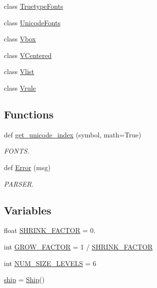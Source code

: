 \begin{DoxyCompactItemize}
\item 
class \hyperlink{classmatplotlib_1_1__mathtext_1_1TruetypeFonts}{Truetype\+Fonts}
\item 
class \hyperlink{classmatplotlib_1_1__mathtext_1_1UnicodeFonts}{Unicode\+Fonts}
\item 
class \hyperlink{classmatplotlib_1_1__mathtext_1_1Vbox}{Vbox}
\item 
class \hyperlink{classmatplotlib_1_1__mathtext_1_1VCentered}{V\+Centered}
\item 
class \hyperlink{classmatplotlib_1_1__mathtext_1_1Vlist}{Vlist}
\item 
class \hyperlink{classmatplotlib_1_1__mathtext_1_1Vrule}{Vrule}
\end{DoxyCompactItemize}
\subsection*{Functions}
\begin{DoxyCompactItemize}
\item 
def \hyperlink{namespacematplotlib_1_1__mathtext_abb90b6223775b3aa81cddd113bd774b5}{get\+\_\+unicode\+\_\+index} (symbol, math=True)
\begin{DoxyCompactList}\small\item\em F\+O\+N\+TS. \end{DoxyCompactList}\item 
def \hyperlink{namespacematplotlib_1_1__mathtext_a1a53497c9c5204fef2d4475ab2493f9f}{Error} (msg)
\begin{DoxyCompactList}\small\item\em P\+A\+R\+S\+ER. \end{DoxyCompactList}\end{DoxyCompactItemize}
\subsection*{Variables}
\begin{DoxyCompactItemize}
\item 
float \hyperlink{namespacematplotlib_1_1__mathtext_a6ea1ec341ab87d7a021698fc808350ad}{S\+H\+R\+I\+N\+K\+\_\+\+F\+A\+C\+T\+OR} = 0.
\item 
int \hyperlink{namespacematplotlib_1_1__mathtext_abb74b3316b15ee80c96cc849b9a0168a}{G\+R\+O\+W\+\_\+\+F\+A\+C\+T\+OR} = 1 / \hyperlink{namespacematplotlib_1_1__mathtext_a6ea1ec341ab87d7a021698fc808350ad}{S\+H\+R\+I\+N\+K\+\_\+\+F\+A\+C\+T\+OR}
\item 
int \hyperlink{namespacematplotlib_1_1__mathtext_a79e4632370bbfe01817c54c98891a160}{N\+U\+M\+\_\+\+S\+I\+Z\+E\+\_\+\+L\+E\+V\+E\+LS} = 6
\item 
\hyperlink{namespacematplotlib_1_1__mathtext_aca7be86fbf667dc9ec9eea6dcf93fb24}{ship} = \hyperlink{classmatplotlib_1_1__mathtext_1_1Ship}{Ship}()
\end{DoxyCompactItemize}


